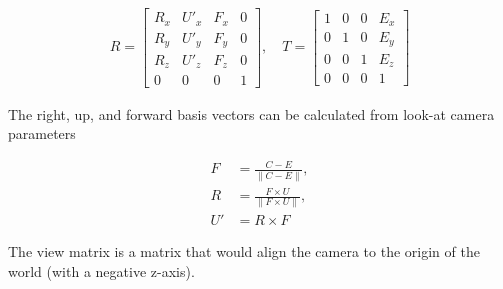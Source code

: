 \begin{align}
R =
\begin{bmatrix}
R_x & U'_x & F_x & 0 \\
R_y & U'_y & F_y & 0 \\
R_z & U'_z & F_z & 0 \\
0   & 0   & 0   & 1
\end{bmatrix}, \quad
T =
\begin{bmatrix}
1 & 0 & 0 & E_x \\
0 & 1 & 0 & E_y \\
0 & 0 & 1 & E_z \\
0   & 0   & 0   & 1
\end{bmatrix}
\label{eq:cam_t_r}
\end{align}

\noindent
The right, up, and forward basis vectors can be calculated from look-at camera parameters \cite{3dgep_view_matrix}

\begin{align}
F &= \frac{C - E}{\|C - E\|}, \\
R &= \frac{F \times U}{\|F \times U\|}, \\
U' &= R \times F
\end{align}

\noindent
The view matrix is a matrix that would align the camera to the origin of the world (with a negative z-axis).

